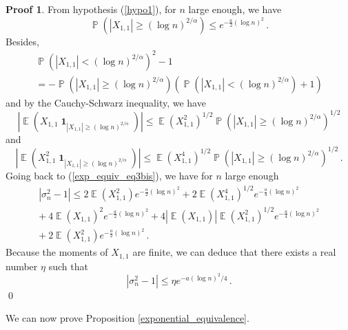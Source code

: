 \documentclass[11pt,a4paper]{article}
\DeclareMathOperator{\E}{\mathbb{E}}
\DeclareMathOperator{\PR}{\mathbb{P}}
\DeclareMathOperator{\1}{\mathbf{1}}
\theoremstyle{definition}
\newtheorem*{Proof}{Proof}
\begin{document}
\begin{Proof}
From hypothesis (\ref{hypo1}), for $n$ large enough, we have
\begin{displaymath}
\PR(|X_{1,1}| \ge (\log n)^{2/\alpha}) \le e^{-\frac{a}{2} (\log n)^2} \, .
\end{displaymath}
Besides,
\begin{multline*}
\PR(|X_{1,1}| < (\log n)^{2/\alpha})^2 - 1 \\
= - \PR(|X_{1,1}| \ge (\log n)^{2/\alpha}) \left( \PR(|X_{1,1}| < (\log n)^{2/\alpha}) + 1 \right)
\end{multline*}
and by the Cauchy-Schwarz inequality, we have
\begin{displaymath}
\left| \E \left( X_{1,1} \1_{|X_{1,1}| \ge (\log n)^{2/\alpha}} \right) \right| \le \E(X_{1,1}^2)^{1/2} \PR(|X_{1,1}| \ge (\log n)^{2/\alpha})^{1/2}
\end{displaymath}
and
\begin{displaymath}
\left| \E \left( X_{1,1}^2 \1_{|X_{1,1}| \ge (\log n)^{2/\alpha}} \right) \right| \le \E(X_{1,1}^4)^{1/2} \PR(|X_{1,1}| \ge (\log n)^{2/\alpha})^{1/2} \, .
\end{displaymath}
Going back to (\ref{exp_equiv_eq3bis}), we have for $n$ large enough
\begin{multline*}
|\sigma_n^2-1| \le 2 \E(X_{1,1}^2) e^{-\frac{a}{2} (\log n)^2} + 2 \E(X_{1,1}^4)^{1/2} e^{-\frac{a}{4} (\log n)^2} \\
+ \ 4 \E(X_{1,1})^2 e^{-\frac{a}{2} (\log n)^2} + 4 |\E(X_{1,1})| \E(X_{1,1}^2)^{1/2} e^{-\frac{a}{4} (\log n)^2} \\
+ \ 2 \E(X_{1,1}^2) e^{-\frac{a}{2} (\log n)^2} \, .
\end{multline*}
Because the moments of $X_{1,1}$ are finite, we can deduce that there exists a real number $\eta$ such that
\begin{displaymath}
|\sigma_n^2-1| \le \eta e^{-a(\log n)^2/4} \, .
\end{displaymath} \qed
\end{Proof}

We can now prove Proposition \ref{exponential_equivalence}.
\end{document}
